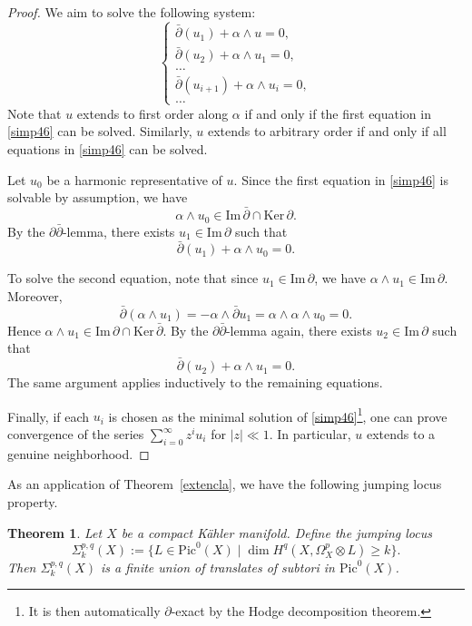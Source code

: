 \documentclass[english]{amsart}
\newcommand{\im}{\mathrm{Im} \,}
\renewcommand{\ker}{\mathrm{Ker} \,}
\renewcommand{\ge}{\geqslant}
\newcommand{\Pic}{\mathrm{Pic}}
\newcommand{\dbar}{\bar \partial}
\newtheorem{thm}{Theorem}[section]
\numberwithin{equation}{thm}
\begin{document}
\begin{proof}
	We aim to solve the following system:
	\begin{equation}\label{simp46}
		\begin{cases}
			\dbar(u_1) + \alpha \wedge u = 0,\\
			\dbar(u_2) + \alpha \wedge u_1 = 0,\\
			\ldots\\
			\dbar(u_{i+1}) + \alpha \wedge u_i = 0,\\
			\ldots
		\end{cases}
	\end{equation}
	Note that $u$ extends to first order along $\alpha$ if and only if the first equation in \eqref{simp46} can be solved.
	Similarly, $u$ extends to arbitrary order if and only if all equations in \eqref{simp46} can be solved.
	
	Let $u_0$ be a harmonic representative of $u$. Since the first equation in \eqref{simp46} is solvable by assumption, we have
	\[
	\alpha \wedge u_0 \in \im \dbar \cap \ker \partial.
	\]
	By the $\partial\dbar$-lemma, there exists $u_1 \in \im \partial$ such that
	\[
	\dbar(u_1) + \alpha \wedge u_0 = 0.
	\]
	
	To solve the second equation, note that since $u_1 \in \im \partial$, we have $\alpha \wedge u_1 \in \im \partial$. Moreover,
	\[
	\dbar(\alpha \wedge u_1) = - \alpha \wedge \dbar u_1
	= \alpha \wedge \alpha \wedge u_0 = 0.
	\]
	Hence $\alpha \wedge u_1 \in \im \partial \cap \ker \dbar$.
	By the $\partial\dbar$-lemma again, there exists $u_2 \in \im \partial$ such that
	\[
	\dbar(u_2) + \alpha \wedge u_1 = 0.
	\]
	The same argument applies inductively to the remaining equations.
	
	Finally, if each $u_i$ is chosen as the minimal solution of \eqref{simp46}\footnote{It is then automatically $\partial$-exact by the Hodge decomposition theorem.},
	one can prove convergence of the series $\sum_{i=0}^\infty z^i u_i$ for $|z|\ll 1$.
	In particular, $u$ extends to a genuine neighborhood.
\end{proof}

\noindent
As an application of Theorem~\ref{extencla}, we have the following jumping locus property.

\begin{thm}\cite{GL87, GL91}\label{gl}
	Let $X$ be a compact K\"ahler manifold. Define the jumping locus
	\[
	\Sigma^{p,q}_k(X)
	:= \{ L \in \Pic^0(X) \mid \dim H^{q}(X,\Omega_X^{p}\otimes L) \ge k \}.
	\]
	Then $\Sigma^{p,q}_k(X)$ is a finite union of translates of subtori in $\Pic^0(X)$.
\end{thm}
\end{document}
